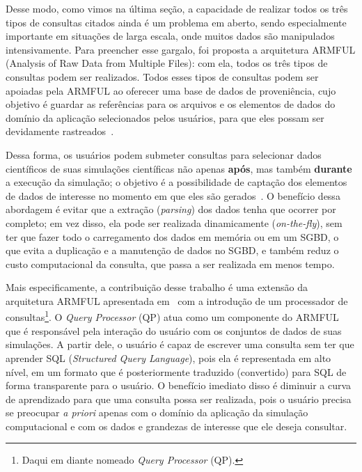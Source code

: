 Desse modo, como vimos na última seção, a capacidade de realizar todos os três tipos de consultas citados ainda é um problema em aberto, sendo especialmente importante em situações de larga escala, onde muitos dados são manipulados intensivamente.
Para preencher esse gargalo, foi proposta a arquitetura  ARMFUL (Analysis of Raw Data from Multiple Files)\cite{silva2017raw,silva2016situ}: com ela, todos os três tipos de consultas podem ser realizados. Todos esses tipos de consultas podem ser apoiadas pela ARMFUL ao oferecer uma base de dados de proveniência, cujo objetivo é guardar as referências para os arquivos e os elementos de dados do domínio da aplicação selecionados pelos usuários, para que eles possam ser devidamente rastreados~\cite{silva2015analyzing}.

Dessa forma, os usuários podem submeter consultas para selecionar dados científicos de suas simulações científicas não apenas \textbf{após}, mas também \textbf{durante} a execução da simulação; o objetivo é a possibilidade de captação dos elementos de dados de interesse no momento em que eles são gerados~\cite{silva2015analyzing}. O benefício dessa abordagem é evitar que a extração (\textit{parsing}) dos dados tenha que ocorrer por completo; em vez disso, ela pode ser realizada dinamicamente (\textit{on-the-fly}), sem ter que fazer todo o carregamento dos dados em memória ou em um SGBD, o que evita a duplicação e a manutenção de dados no SGBD, e também reduz o custo computacional da consulta, que passa a ser realizada em menos tempo.

Mais especificamente, a contribuição desse trabalho é uma extensão da arquitetura ARMFUL apresentada em~\cite{silva2016situ,silva2017raw} com a introdução de um processador de consultas\footnote{Daqui em diante nomeado \textit{Query Processor} (QP).}.
O  \textit{Query Processor} (QP) atua como um componente do ARMFUL que é responsável pela interação do usuário com os conjuntos de dados de suas simulações. A partir dele, o usuário é capaz de escrever uma consulta sem ter que aprender  SQL (\textit{Structured Query Language}), pois ela é representada em alto nível, em um formato que é posteriormente traduzido (convertido) para SQL de forma transparente para o usuário. O benefício imediato disso é diminuir a curva de aprendizado para que uma consulta possa ser realizada, pois o usuário precisa se preocupar \textit{a priori} apenas com o domínio da aplicação da simulação computacional e com os dados e grandezas de interesse que ele deseja consultar.

